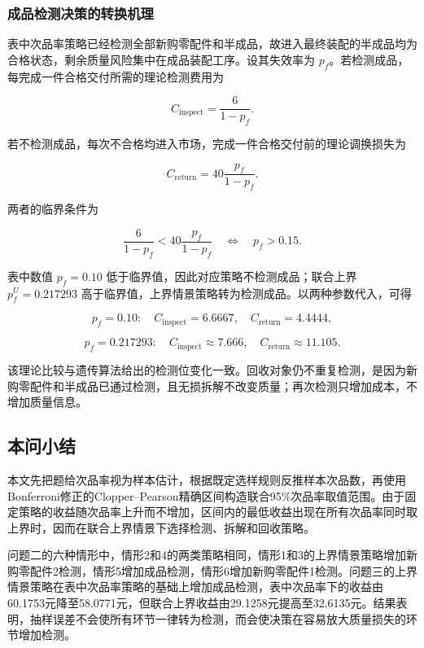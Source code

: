 \documentclass{cumcm}
\numberwithin{figure}{section}
\numberwithin{table}{section}
\begin{document}
\subsubsection{成品检测决策的转换机理}\label{ux6210ux54c1ux68c0ux6d4bux51b3ux7b56ux7684ux8f6cux6362ux673aux7406}

表中次品率策略已经检测全部新购零配件和半成品，故进入最终装配的半成品均为合格状态，剩余质量风险集中在成品装配工序。设其失效率为 \(p_f\)。若检测成品，每完成一件合格交付所需的理论检测费用为

\[
C_{\mathrm{inspect}}=\frac{6}{1-p_f}.
\]

若不检测成品，每次不合格均进入市场，完成一件合格交付前的理论调换损失为

\[
C_{\mathrm{return}}=40\frac{p_f}{1-p_f}.
\]

两者的临界条件为

\[
\frac{6}{1-p_f}<40\frac{p_f}{1-p_f}
\quad\Longleftrightarrow\quad
p_f>0.15.
\]

表中数值 \(p_f=0.10\) 低于临界值，因此对应策略不检测成品；联合上界 \(p_f^U=0.217293\) 高于临界值，上界情景策略转为检测成品。以两种参数代入，可得

\[
p_f=0.10:\quad
C_{\mathrm{inspect}}=6.6667,
\quad C_{\mathrm{return}}=4.4444,
\]

\[
p_f=0.217293:\quad
C_{\mathrm{inspect}}\approx7.666,
\quad C_{\mathrm{return}}\approx11.105.
\]

该理论比较与遗传算法给出的检测位变化一致。回收对象仍不重复检测，是因为新购零配件和半成品已通过检测，且无损拆解不改变质量；再次检测只增加成本，不增加质量信息。

\subsection{本问小结}\label{ux672cux95eeux5c0fux7ed3-1}

本文先把题给次品率视为样本估计，根据既定选样规则反推样本次品数，再使用Bonferroni修正的Clopper--Pearson精确区间构造联合95\%次品率取值范围。由于固定策略的收益随次品率上升而不增加，区间内的最低收益出现在所有次品率同时取上界时，因而在联合上界情景下选择检测、拆解和回收策略。

问题二的六种情形中，情形2和4的两类策略相同，情形1和3的上界情景策略增加新购零配件2检测，情形5增加成品检测，情形6增加新购零配件1检测。问题三的上界情景策略在表中次品率策略的基础上增加成品检测，表中次品率下的收益由60.1753元降至58.0771元，但联合上界收益由29.1258元提高至32.6135元。结果表明，抽样误差不会使所有环节一律转为检测，而会使决策在容易放大质量损失的环节增加检测。

\FloatBarrier
\end{document}
